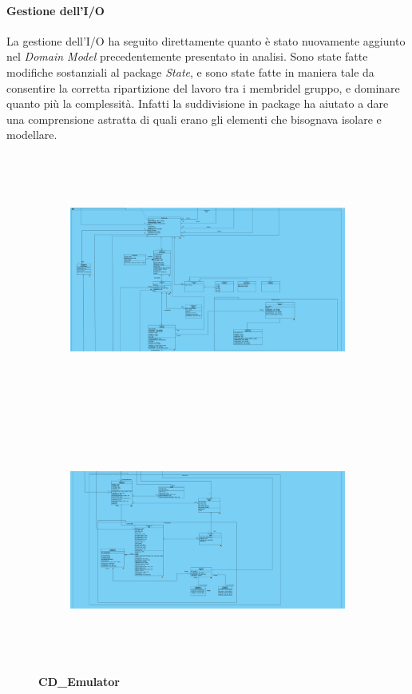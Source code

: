 \documentclass[11pt]{article}
\begin{document}
\paragraph{Gestione dell'I/O}
La gestione dell'I/O ha seguito direttamente quanto è stato nuovamente aggiunto nel \emph{Domain Model} precedentemente presentato in analisi. Sono state fatte modifiche sostanziali al package \emph{State}, e sono state fatte in maniera tale da consentire la corretta ripartizione del lavoro tra i membridel gruppo, e dominare quanto più la complessità. Infatti la suddivisione in package ha aiutato a dare una comprensione astratta di quali erano gli elementi che bisognava isolare e modellare. 
\begin{figure}[!h]
\vspace*{-4cm}

\centering
	\begin{subfigure}{600px}
	\hspace*{-4.3cm}
	\includegraphics[width=600px, height=314px]{CD_Emulator_4.png}\\
	\end{subfigure}
	\begin{subfigure}{600px}
	\hspace*{-4.3cm}
	\includegraphics[width=600px, height=300px]{CD_Emulator_5.png}\\
	\end{subfigure}
	\small\textbf{CD\_Emulator}
\end{figure}\\
\end{document}
